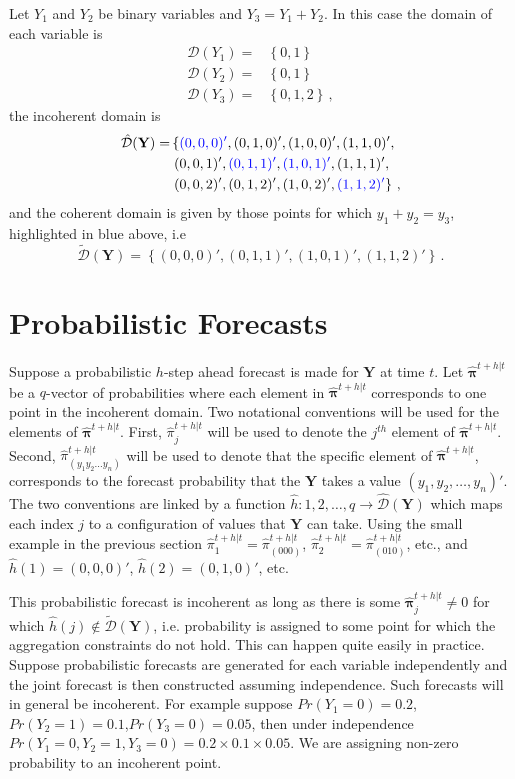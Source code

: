 \documentclass{article}
\newcommand{\bY}{\mathbf{Y}}
\newcommand{\bpi}{\bm{\pi}}
\begin{document}
    Let $Y_1$ and $Y_2$ be binary variables and $Y_3=Y_1+Y_2$. In this case the domain of each variable is
    \begin{align*}
      \mathcal{D}(Y_1)=&\left\{0,1\right\}\\
      \mathcal{D}(Y_2)=&\left\{0,1\right\}\\
      \mathcal{D}(Y_3)=&\left\{0,1,2\right\}\,,
    \end{align*}	
    the incoherent domain is
    \begin{align*}
    \hat{\mathcal D}(\bY)=&\left\{\textcolor{blue}{(0,0,0)'},(0,1,0)',(1,0,0)',(1,1,0)',\right.\\
    &\left.(0,0,1)',\textcolor{blue}{(0,1,1)'},\textcolor{blue}{(1,0,1)'},(1,1,1)',\right.\\
    &\left.(0,0,2)',(0,1,2)',(1,0,2)',\textcolor{blue}{(1,1,2)'}\right\}\,,
    \end{align*}
    and the coherent domain is given by those points for which $y_1+y_2=y_3$, highlighted in blue above, i.e
    \[
        \tilde{\mathcal D}(\bY)=\left\{(0,0,0)',(0,1,1)',(1,0,1)',(1,1,2)'\right\}\,.
    \]
    
    \section{Probabilistic Forecasts}
    Suppose a probabilistic $h$-step ahead forecast is made for $\bY$ at time $t$. Let $\hat{\bpi}^{t+h|t}$ be a $q$-vector of probabilities where each element in $\hat{\bpi}^{t+h|t}$ corresponds to one point in the incoherent domain. Two notational conventions will be used for the elements of $\hat{\bpi}^{t+h|t}$. First, $\hat{\pi}_j^{t+h|t}$ will be used to denote the $j^{th}$ element of $\hat{\bpi}^{t+h|t}$.  Second, $\hat{\pi}_{(y_1 y_2 \dots y_n)}^{t+h|t}$ will be used to denote that the specific element of $\hat{\bpi}^{t+h|t}$, corresponds to the forecast probability that the $\bY$ takes a value $(y_1,y_2,\dots,y_n)'$. The two conventions are linked by a function $\hat{h}:{1,2,\dots,q}\rightarrow\hat{\mathcal{D}}(\bY)$ which maps each index $j$ to a configuration of values that $\bY$ can take. Using the small example in the previous section $\hat{\pi}_1^{t+h|t}=\hat{\pi}_{(000)}^{t+h|t}$, $\hat{\pi}_2^{t+h|t}=\hat{\pi}_{(010)}^{t+h|t}$, etc., and $\hat{h}(1)=(0,0,0)'$, $\hat{h}(2)=(0,1,0)'$, etc.
    
    This probabilistic forecast is incoherent as long as there is some $\hat{\bpi}^{t+h|t}_j\neq 0$ for which $\hat{h}(j)\notin\tilde{\mathcal{D}}(\bY)$, i.e. probability is assigned to some point for which the aggregation constraints do not hold. This can happen quite easily in practice. Suppose probabilistic forecasts are generated for each variable independently and the joint forecast is then constructed assuming independence. Such forecasts will in general be incoherent. For example suppose $Pr(Y_1=0)=0.2$,$Pr(Y_2=1)=0.1$,$Pr(Y_3=0)=0.05$, then under independence $Pr(Y_1=0,Y_2=1,Y_3=0)=0.2\times0.1\times0.05$. We are assigning non-zero probability to an incoherent point.
    
\end{document}
